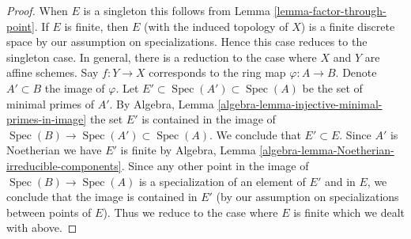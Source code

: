 \documentclass[10pt,a4paper]{amsart}
\theoremstyle{plain}
\theoremstyle{definition}
\theoremstyle{remark}
\numberwithin{equation}{subsection}
\def\Spec{\mathop{\mathrm{Spec}}}
\begin{document}
\begin{proof}
When $E$ is a singleton this follows from
Lemma \ref{lemma-factor-through-point}. If $E$ is finite, then $E$
(with the induced topology of $X$) is a finite discrete space by
our assumption on specializations. Hence this case reduces to the
singleton case. In general, there is a reduction to the
case where $X$ and $Y$ are affine schemes. Say $f : Y \to X$ corresponds to
the ring map $\varphi : A \to B$. Denote $A' \subset B$ the image of $\varphi$.
Let $E' \subset \Spec(A') \subset \Spec(A)$ be the set of minimal primes
of $A'$. By Algebra, Lemma \ref{algebra-lemma-injective-minimal-primes-in-image}
the set $E'$ is contained in the image of
$\Spec(B) \to \Spec(A') \subset \Spec(A)$. We conclude that $E' \subset E$.
Since $A'$ is Noetherian we have $E'$ is finite by Algebra, Lemma
\ref{algebra-lemma-Noetherian-irreducible-components}.
Since any other point in the image of $\Spec(B) \to \Spec(A)$ is
a specialization of an element of $E'$ and in $E$, we conclude that
the image is contained in $E'$ (by our assumption on specializations between
points of $E$). Thus we reduce to the case where
$E$ is finite which we dealt with above.
\end{proof}
\end{document}
